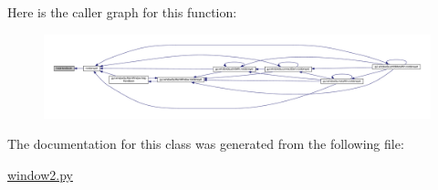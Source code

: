 Here is the caller graph for this function\-:\nopagebreak
\begin{figure}[H]
\begin{center}
\leavevmode
\includegraphics[width=350pt]{classgui_1_1window2_1_1MainWindow_a784d15d1157ea5b181c63d73daa3fc5e_icgraph}
\end{center}
\end{figure}




The documentation for this class was generated from the following file\-:\begin{DoxyCompactItemize}
\item 
\hyperlink{window2_8py}{window2.\-py}\end{DoxyCompactItemize}
